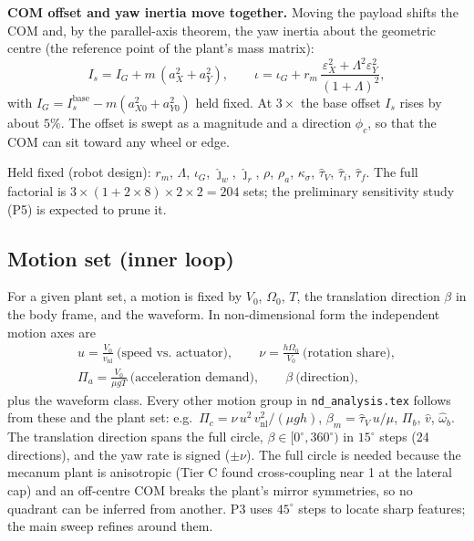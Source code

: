 \documentclass[11pt]{article}
\begin{document}
\medskip
\textbf{COM offset and yaw inertia move together.} Moving the payload shifts the
COM and, by the parallel-axis theorem, the yaw inertia about the geometric centre
(the reference point of the plant's mass matrix):
\begin{equation}
I_s = I_G + m\,(a_X^2 + a_Y^2), \qquad
\iota = \iota_G + r_m\,\frac{\varepsilon_X^2 + \Lambda^2\varepsilon_Y^2}{(1+\Lambda)^2},
\end{equation}
with $I_G = I_s^{\mathrm{base}} - m(a_{X0}^2 + a_{Y0}^2)$ held fixed. At $3\times$ the
base offset $I_s$ rises by about $5\%$. The offset is swept as a magnitude and a
direction $\phi_c$, so that the COM can sit toward any wheel or edge.

\medskip
Held fixed (robot design): $r_m$, $\Lambda$, $\iota_G$, $\hat\jmath_w$,
$\hat\jmath_r$, $\rho$, $\rho_a$, $\kappa_\sigma$, $\hat\tau_V$, $\hat\tau_i$,
$\hat\tau_f$. The full factorial is $3\times(1 + 2\times8)\times2\times2 = 204$ sets; the
preliminary sensitivity study (P5) is expected to prune it.

\subsection{Motion set (inner loop)}
For a given plant set, a motion is fixed by $V_0$, $\Omega_0$, $T$, the
translation direction $\beta$ in the body frame, and the waveform. In
non-dimensional form the independent motion axes are
\begin{gather*}
u = \frac{V_0}{v_{\mathrm{nl}}}\ \text{(speed vs.\ actuator)},\qquad
\nu = \frac{h\Omega_0}{V_0}\ \text{(rotation share)},\\
\Pi_a = \frac{V_0}{\mu g T}\ \text{(acceleration demand)},\qquad
\beta\ \text{(direction)},
\end{gather*}
plus the waveform class. Every other motion group in \texttt{nd\_analysis.tex}
follows from these and the plant set: e.g.\
$\Pi_c = \nu\,u^2\,v_{\mathrm{nl}}^2/(\mu g h)$, $\beta_m = \hat\tau_V\,u/\mu$,
$\Pi_b$, $\hat v$, $\hat\omega_b$. The translation direction spans the full circle,
$\beta \in [0^\circ, 360^\circ)$ in $15^\circ$ steps (24 directions), and the yaw
rate is signed ($\pm\nu$). The full circle is needed because the mecanum plant is
anisotropic (Tier C found cross-coupling near 1 at the lateral cap) and an
off-centre COM breaks the plant's mirror symmetries, so no quadrant can be
inferred from another. P3 uses $45^\circ$ steps to locate sharp features; the
main sweep refines around them.
\end{document}
